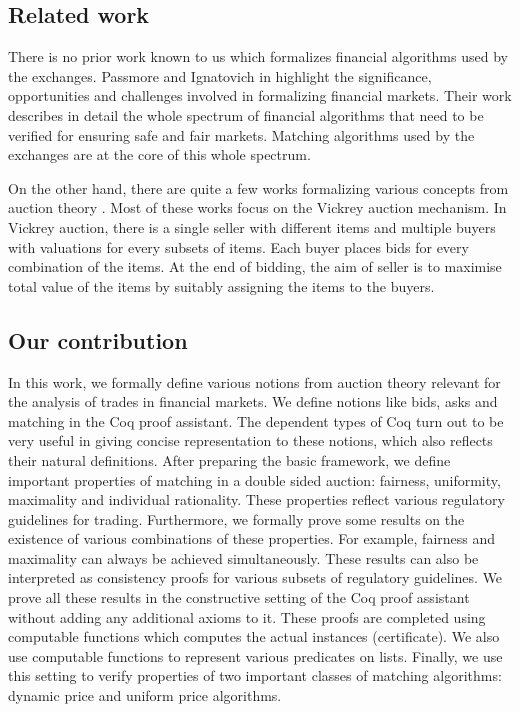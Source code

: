 \documentclass[a4paper,UKenglish,cleveref, autoref]{lipics-v2019}
\begin{document}
\subsection{Related work}\label{sec:related}
There is no prior work known to us which formalizes financial algorithms used by the exchanges. Passmore and Ignatovich in \cite{PassmoreI17} highlight the significance, opportunities and challenges involved in formalizing financial markets. Their work describes in detail the whole spectrum of financial algorithms that need to be verified for ensuring safe and fair markets. Matching algorithms used by the exchanges are at the core of this whole spectrum.  

On the other hand, there are quite a few works  formalizing various concepts from auction theory \cite{toolbox,lange,frank}. Most of these works focus on the Vickrey auction mechanism. In Vickrey auction, there is a single seller with different items and multiple buyers with valuations for every subsets of items. Each buyer places bids for every combination of the items. At the end of bidding, the aim of seller is to maximise total value of the items by suitably assigning the items to the buyers.

\subsection{Our contribution}
In this work, we formally define various notions from auction theory relevant for the analysis of trades in financial markets. We define notions like bids, asks and matching in the Coq proof assistant. The dependent types of Coq turn out to be very useful in giving concise representation to these notions, which also reflects their natural definitions. After preparing the basic framework, we define important properties of matching in a double sided auction: fairness, uniformity, maximality and individual rationality. These properties reflect various regulatory guidelines for trading. Furthermore, we formally prove some results on the existence of various combinations of these properties. For example, fairness and maximality can always be achieved simultaneously. These results can also be interpreted as consistency proofs for various subsets of regulatory guidelines. We prove all these results in the constructive setting of the Coq proof assistant without adding any additional axioms to it. These proofs are completed using computable functions which computes the actual instances (certificate). We also use computable functions to represent various predicates on lists. Finally, we use this setting to verify properties of two important classes of matching algorithms: dynamic price and uniform price algorithms. 
\end{document}
